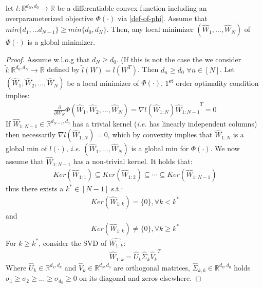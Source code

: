 \documentclass[12pt]{article}
\newcommand{\ie}{{\it i.e. }}
\begin{document}
	\begin{theorem}
	let $l:\mathbb{R}^{d_N, d_0}\to\mathbb{R}$ be a differentiable convex function including an overparameterized objective $\Phi(\cdot)$ via \eqref{def-of-phi}. 
	Assume that $min\{d_1,...d_{N-1}\} \geq min\{d_0, d_N\}$. Then, any local minimizer $({\widehat{W}_1},..., {\widehat{W}_N})$ of $\Phi(\cdot)$ is a global minimizer.
	\end{theorem}
	\begin{proof}
	    Assume w.l.o.g that $d_N \geq d_0$. (If this is not the case the we consider $\tilde{l}:\mathbb{R}^{d_0,d_N} \to \mathbb{R}$ defined by $\tilde{l}(W) = l(W^T)$. Then $d_n \geq d_0$ $\forall n \in [N]$. Let $({\widehat{W}_1}, {\widehat{W}_2}, ... , {\widehat{W}_N})$ be a local minimizer of $\Phi(\cdot)$. 1\textsuperscript{st} order optimality condition implies:
	    \begin{align*}
	        \frac{\partial}{\partial W_N}\Phi({\widehat{W}_1}, {\widehat{W}_2}, ..., {\widehat{W}_N}) = \nabla{l({{\widehat{W}}_{1:N}})}{{\widehat{W}_{1:N-1}}}^T = 0
	    \end{align*}
	    If ${{\widehat{W}_{1:N-1}}} \in \mathbb{R}^{d_{N-1}, d_0}$ has a trivial kernel (\ie has linearly independent columns) then necessarily $\nabla{l({{\widehat{W}_{1:N}}})} = 0$, which by convexity implies that ${{\widehat{W}_{1:N}}}$ is a global min of $l(\cdot)$, \ie $({\widehat{W}_1},..., {\widehat{W}_N})$ is a global min for $\Phi(\cdot)$.
	    We now assume that ${{\widehat{W}_{1:N-1}}}$ has a non-trivial kernel. It holds that:
	    \begin{align*}
	        Ker({{\widehat{W}_{1:1}}}) \subseteq Ker({{\widehat{W}_{1:2}}}) \subseteq \cdots \subseteq Ker({{\widehat{W}_{1:N-1}}})
	    \end{align*}
	    thus there exists a $k^\ast \in [N-1]$ s.t.:
	    \begin{align*}
	        Ker({{\widehat{W}_{1:k}}}) = \{0\}, \forall k<k^\ast
        \end{align*}
        and
        \begin{align*}
	        Ker({{\widehat{W}_{1:k}}}) \neq \{0\}, \forall k \geq k^\ast
	    \end{align*}
	    \newpage
	    For $k \geq k^\ast$, consider the SVD of $\widehat{W_{1:k}}$:
	    \begin{align*}
	        {{\widehat{W}_{1:k}}} = {\widehat{U}_k}{\widehat{\Sigma}_k}{\widehat{V}_k}^T
	    \end{align*}
	    Where ${\widehat{U}_k} \in \mathbb{R}^{d_k, d_k}$ and ${\widehat{V}_k} \in \mathbb{R}^{d_0,d_0}$ are orthogonal matrices, ${\widehat{\Sigma}_{k,k}} \in \mathbb{R}^{d_k, d_0}$ holds $\sigma_1 \geq \sigma_2 \geq ... \geq \sigma_{d_0} \geq 0$ on its diagonal and zeros elsewhere.

\end{proof}
\end{document}
